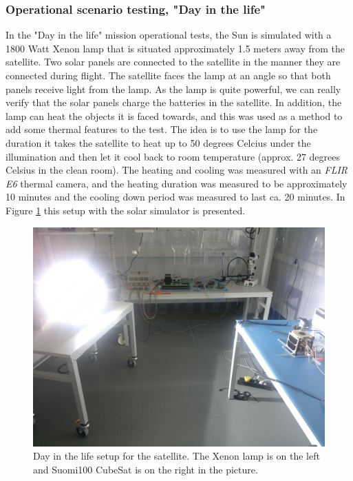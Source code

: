 \documentclass[english,12pt,a4paper,pdftex,elec,utf8]{aaltothesis}
\begin{document}
\subsubsection{Operational scenario testing, "Day in the life"}
In the "Day in the life" mission operational tests, the Sun is simulated with a %
1800 Watt Xenon lamp that is situated approximately 1.5 meters away from the satellite. Two solar panels are connected to the satellite in the manner they are connected during flight. The satellite faces the lamp at an angle so that both panels receive light from the lamp. As the lamp is quite powerful, we can really verify that the solar panels charge the batteries in the satellite. In addition, the lamp can heat the objects it is faced towards, and this was used as a method to add some thermal features to the test. The idea is to use the lamp for the duration it takes the satellite to heat up to 50 degrees Celcius under the illumination and then let it cool back to room temperature (approx. 27 degrees Celsius in the clean room). The heating and cooling was measured with an \textit{FLIR E6} thermal camera, and the heating duration was measured to be approximately 10 minutes and the cooling down period was measured to last ca. 20 minutes.
In Figure \ref{dayinlife1} this setup with the solar simulator is presented.\par
\begin{figure}[h!]
\centering
\includegraphics[scale=0.3]{daysetuplamp2}
\caption{Day in the life setup for the satellite. The Xenon lamp is on the left and Suomi100 CubeSat is on the right in the picture.}
\label{dayinlife1}
\end{figure} 
\end{document}
